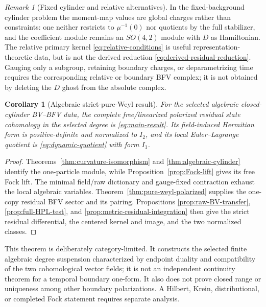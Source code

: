 \documentclass[11pt]{article}
\newtheorem{corollary}[theorem]{Corollary}
\theoremstyle{definition}
\theoremstyle{remark}
\newtheorem{remark}[theorem]{Remark}
\begin{document}
\begin{remark}[Fixed cylinder and relative alternatives]
In the fixed-background cylinder problem the moment-map values are global
charges rather than constraints: one neither restricts to $\mu^{-1}(0)$ nor
quotients by the full stabilizer, and the coefficient module remains an
$SO(4,2)$ module with $D$ as Hamiltonian.  The relative primary kernel
\eqref{eq:relative-conditions} is useful representation-theoretic data, but
is not the derived reduction \eqref{eq:derived-residual-reduction}.  Gauging
only a subgroup, retaining boundary charges, or deparametrizing time requires
the corresponding relative or boundary BFV complex; it is not obtained by
deleting the $D$ ghost from the absolute complex.
\end{remark}

\begin{corollary}[Algebraic strict-pure-Weyl result]
\label{cor:algebraic-pure-weyl}
For the selected algebraic closed-cylinder BV--BFV data, the complete
free/linearized polarized residual state cohomology in the selected degree is
\eqref{eq:main-result}.  Its field-induced Hermitian form is positive-definite
and normalized to $I_2$, and its
local Euler--Lagrange quotient is \eqref{eq:dynamic-quotient} with form
$I_1$.
\end{corollary}

\begin{proof}
Theorems~\ref{thm:curvature-isomorphism} and
\ref{thm:algebraic-cylinder} identify the one-particle module, while
Proposition~\ref{prop:Fock-lift} gives its free Fock lift.  The minimal
field/raw dictionary and gauge-fixed contraction exhaust the local algebraic
variables.  Theorem~\ref{thm:pure-weyl-polarized} supplies the one-copy
residual BFV sector and its pairing.  Propositions
\ref{prop:raw-BV-transfer}, \ref{prop:full-HPL-test}, and
\ref{prop:metric-residual-integration} then give the strict residual
differential, the centered kernel and image, and the two normalized classes.
\end{proof}

This theorem is deliberately category-limited.  It constructs the selected
finite algebraic degree suspension characterized by endpoint duality and
compatibility of the two cohomological vector fields; it is not an
independent continuity theorem for a temporal boundary one-form.  It also
does not prove closed range or uniqueness among other boundary
polarizations.  A Hilbert, Krein, distributional, or completed Fock
statement requires separate analysis.
\end{document}
